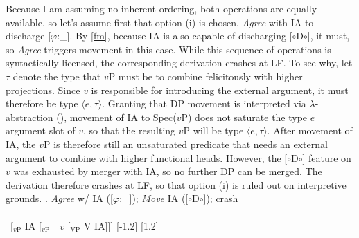 \documentclass[11pt, letterpaper]{paper_nick}
\newcommand{\fm}[1]{[$\circ$#1$\circ$]}
\begin{document}
Because I am assuming no inherent ordering, both operations are equally available, so let's assume first that option (i) is chosen, \emph{Agree} with IA to discharge [$\varphi$:\_]. By \ref{fm}, because IA is also capable of discharging \fm{D}, it must, so \emph{Agree} triggers movement in this case. While this sequence of operations is syntactically licensed, the corresponding derivation crashes at LF. To see why, let $\tau$ denote the type that $v$P must be to combine felicitously with higher projections. Since $v$ is responsible for introducing the external argument, it must therefore be type $\langle e, \tau\rangle$. Granting that DP movement is interpreted via $\lambda$-abstraction (\citealt{heim97}), movement of IA to Spec($v$P) does not saturate the type $e$ argument slot of $v$, so that the resulting $v$P will be type $\langle e,\tau\rangle$. After movement of IA, the $v$P is therefore still an unsaturated predicate that needs an external argument to combine with higher functional heads. However, the \fm{D} feature on $v$ was exhausted by merger with IA, so no further DP can be merged. The derivation therefore crashes at LF, so that option (i) is ruled out on interpretive grounds. 
\ex. \emph{Agree} w/ IA ([$\varphi$:\_]); \emph{Move} IA (\fm{D}); crash\\\\
\ [$_\text{$v$P}$ \hspace*{-.3cm}IA [$_\text{$v$P}$\ \ \hspace*{-.2cm}\hspace*{-.2cm}$v$ [$_\text{VP}$ V \hspace*{-.3cm}IA]]]
[-1.2]
[1.2]\\
\end{document}
